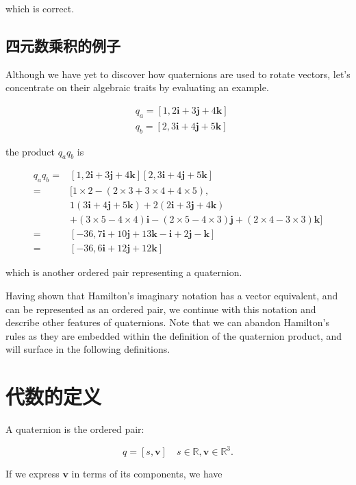 which is correct.

\subsection{四元数乘积的例子}
Although we have yet to discover how quaternions are used to rotate vectors, let's concentrate on their algebraic traits by evaluating an example.

$$
\begin{aligned}
& q_{a}=[1,2 \mathbf{i}+3 \mathbf{j}+4 \mathbf{k}] \\
& q_{b}=[2,3 \mathbf{i}+4 \mathbf{j}+5 \mathbf{k}]
\end{aligned}
$$

the product $q_{a} q_{b}$ is

$$
\begin{aligned}
q_{a} q_{b}= & {[1,2 \mathbf{i}+3 \mathbf{j}+4 \mathbf{k}][2,3 \mathbf{i}+4 \mathbf{j}+5 \mathbf{k}] } \\
= & {[1 \times 2-(2 \times 3+3 \times 4+4 \times 5),} \\
& 1(3 \mathbf{i}+4 \mathbf{j}+5 \mathbf{k})+2(2 \mathbf{i}+3 \mathbf{j}+4 \mathbf{k}) \\
& +(3 \times 5-4 \times 4) \mathbf{i}-(2 \times 5-4 \times 3) \mathbf{j}+(2 \times 4-3 \times 3) \mathbf{k}] \\
= & {[-36,7 \mathbf{i}+10 \mathbf{j}+13 \mathbf{k}-\mathbf{i}+2 \mathbf{j}-\mathbf{k}] } \\
= & {[-36,6 \mathbf{i}+12 \mathbf{j}+12 \mathbf{k}] }
\end{aligned}
$$

which is another ordered pair representing a quaternion.

Having shown that Hamilton's imaginary notation has a vector equivalent, and can be represented as an ordered pair, we continue with this notation and describe other features of quaternions. Note that we can abandon Hamilton's rules as they are embedded within the definition of the quaternion product, and will surface in the following definitions.

\section{代数的定义}
A quaternion is the ordered pair:

$$
q=[s, \mathbf{v}] \quad s \in \mathbb{R}, \mathbf{v} \in \mathbb{R}^{3} .
$$

If we express $\mathbf{v}$ in terms of its components, we have

